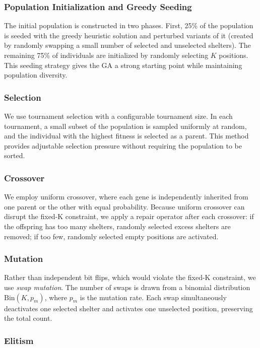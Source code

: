 \documentclass[12pt]{article}
\begin{document}
\subsubsection{Population Initialization and Greedy Seeding}

The initial population is constructed in two phases. First, 25\% of the population is seeded with the greedy heuristic solution and perturbed variants of it (created by randomly swapping a small number of selected and unselected shelters). The remaining 75\% of individuals are initialized by randomly selecting $K$ positions. This seeding strategy gives the GA a strong starting point while maintaining population diversity.

\subsubsection{Selection}

We use tournament selection with a configurable tournament size. In each tournament, a small subset of the population is sampled uniformly at random, and the individual with the highest fitness is selected as a parent. This method provides adjustable selection pressure without requiring the population to be sorted.

\subsubsection{Crossover}

We employ uniform crossover, where each gene is independently inherited from one parent or the other with equal probability. Because uniform crossover can disrupt the fixed-K constraint, we apply a repair operator after each crossover: if the offspring has too many shelters, randomly selected excess shelters are removed; if too few, randomly selected empty positions are activated.

\subsubsection{Mutation}

Rather than independent bit flips, which would violate the fixed-K constraint, we use \textit{swap mutation}. The number of swaps is drawn from a binomial distribution $\text{Bin}(K, p_m)$, where $p_m$ is the mutation rate. Each swap simultaneously deactivates one selected shelter and activates one unselected position, preserving the total count.

\subsubsection{Elitism}
\end{document}
